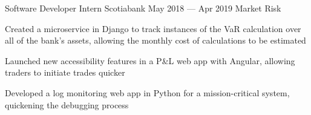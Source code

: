 \begin{cventries}
  \cventry
    {Software Developer Intern}
    {Scotiabank}
    {}
    {May 2018 --- Apr 2019}
    {Market Risk}
    {
      \begin{cvitems}
        \item {Created a microservice in Django to track instances of the VaR calculation over all of the bank's assets, allowing the monthly cost of calculations to be estimated}
        \item {Launched new accessibility features in a P\&L web app with Angular, allowing traders to initiate trades quicker}
        \item {Developed a log monitoring web app in Python for a mission-critical system, quickening the debugging process}
      \end{cvitems}
    }
\end{cventries}
